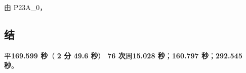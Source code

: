 \documentclass[11pt,a4paper]{article}
\begin{document}
{\cjkfont 由}\allowbreak{} P23A\_0{\cjkfont ，}\allowbreak{}

\subsection{{\cjkfont 结}\allowbreak{}}

{\cjkfont 平}\allowbreak{}\textbf{169.599 {\cjkfont 秒}\allowbreak{}}{\cjkfont （}\allowbreak{} \textbf{2 {\cjkfont 分}\allowbreak{} 49.6 {\cjkfont 秒}\allowbreak{}}{\cjkfont ）}\allowbreak{} \textbf{76 {\cjkfont 次}\allowbreak{}}{\cjkfont 周}\allowbreak{}\textbf{15.028 {\cjkfont 秒}\allowbreak{}}{\cjkfont ；}\allowbreak{}\textbf{160.797 {\cjkfont 秒}\allowbreak{}}{\cjkfont ；}\allowbreak{}\textbf{292.545 {\cjkfont 秒}\allowbreak{}}{\cjkfont 。}\allowbreak{}
\end{document}
